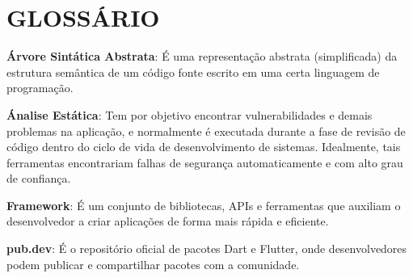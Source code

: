 



\chapter*{GLOSSÁRIO}

{ \setlength{\parindent}{0pt} %

\textbf{Árvore Sintática Abstrata}: É uma representação abstrata (simplificada) da estrutura semântica de um código fonte escrito em uma certa linguagem de programação.

\textbf{Ánalise Estática}: Tem por objetivo encontrar vulnerabilidades e demais problemas na aplicação, e normalmente é executada durante a fase de revisão de código dentro do ciclo de vida de desenvolvimento de sistemas. Idealmente, tais ferramentas encontrariam falhas de segurança automaticamente e com alto grau de confiança.

\textbf{Framework}: É um conjunto de bibliotecas, APIs e ferramentas que auxiliam o desenvolvedor a criar aplicações de forma mais rápida e eficiente.

\textbf{pub.dev}: É o repositório oficial de pacotes Dart e Flutter, onde desenvolvedores podem publicar e compartilhar pacotes com a comunidade.

} %
